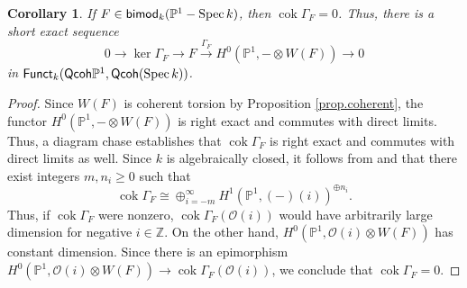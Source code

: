 \documentclass[10pt]{amsart}
\newtheorem{cor}[lemma]{Corollary}
\theoremstyle{definition}
\theoremstyle{remark}
\numberwithin{equation}{section}
\begin{document}
\begin{cor} \label{cor.cokvanish}
If $F \in {\sf bimod }_{k}(\mathbb{P}^{1}-\operatorname{Spec }k)$, then ${\operatorname{cok }\Gamma_{F}}=0$.  Thus, there is a short exact sequence
$$
0 \rightarrow {\operatorname{ker }\Gamma_{F}} \rightarrow F \overset{\Gamma_{F}}{\rightarrow} H^{0}(\mathbb{P}^{1},-\otimes W(F)) \rightarrow 0
$$
in ${\sf Funct}_{k}({\sf Qcoh }\mathbb{P}^{1},{\sf Qcoh }(\operatorname{Spec }k))$.
\end{cor}

\begin{proof}
Since $W(F)$ is coherent torsion by Proposition \ref{prop.coherent}, the functor $H^{0}(\mathbb{P}^{1},-\otimes W(F))$ is right exact and commutes with direct limits.  Thus, a diagram chase establishes that ${\operatorname{cok }\Gamma_{F}}$ is right exact and commutes with direct limits as well.  Since $k$ is algebraically closed, it follows from \cite[Corollary 7.3]{N} and \cite[Theorem 7.12]{N} that there exist integers $m,
n_{i} \geq 0$ such that
$$
{\operatorname{cok }\Gamma_{F}} \cong \oplus_{i=-m}^\infty {H}^{1}(\mathbb{P}^{1},(-)(i))^{\oplus n_{i}}.
$$
Thus, if ${\operatorname{cok }\Gamma_{F}}$ were nonzero, ${\operatorname{cok }\Gamma_{F}}(\mathcal{O}(i))$ would have arbitrarily large dimension for negative $i \in \mathbb{Z}$.  On the other hand, $H^{0}(\mathbb{P}^{1},\mathcal{O}(i) \otimes W(F))$ has constant dimension.  Since there is an epimorphism $H^{0}(\mathbb{P}^{1},\mathcal{O}(i) \otimes W(F)) \rightarrow {\operatorname{cok }\Gamma_{F}}(\mathcal{O}(i))$, we conclude that ${\operatorname{cok }\Gamma_{F}}=0$.
\end{proof}
\end{document}
